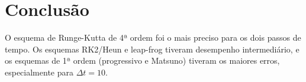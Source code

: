 \documentclass[11pt,a4paper]{article}
\begin{document}
\section{Conclusão}

O esquema de Runge-Kutta de 4ª ordem foi o mais preciso para os dois passos de tempo. Os esquemas RK2/Heun e leap-frog tiveram desempenho intermediário, e os esquemas de 1ª ordem (progressivo e Matsuno) tiveram os maiores erros, especialmente para $\Delta t = 10$.

\vspace{1.2em}
\noindent{}
\end{document}
